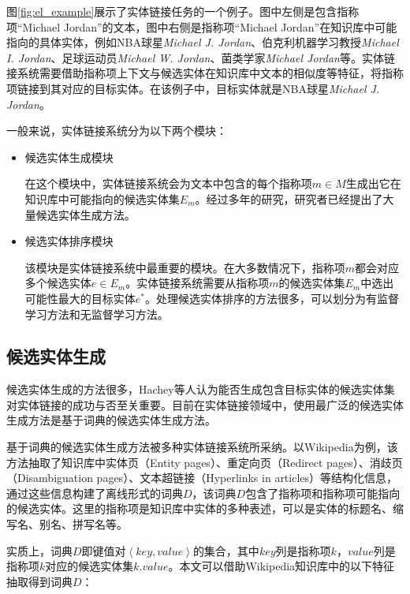 图\ref{fig:el_example}展示了实体链接任务的一个例子。图中左侧是包含指称项“Michael Jordan”的文本，图中右侧是指称项“Michael Jordan”在知识库中可能指向的具体实体，例如NBA球星\textit{Michael J. Jordan}、伯克利机器学习教授\textit{Michael I. Jordan}、足球运动员\textit{Michael W. Jordan}、菌类学家\textit{Michael Jordan}等。实体链接系统需要借助指称项上下文与候选实体在知识库中文本的相似度等特征，将指称项链接到其对应的目标实体。在该例子中，目标实体就是NBA球星\textit{Michael J. Jordan}。

一般来说，实体链接系统分为以下两个模块：
\begin{itemize}
	\item {候选实体生成模块
	
在这个模块中，实体链接系统会为文本中包含的每个指称项$m \in M$生成出它在知识库中可能指向的候选实体集$E_m$。经过多年的研究，研究者已经提出了大量候选实体生成方法。
}
	\item {候选实体排序模块
	
	该模块是实体链接系统中最重要的模块。在大多数情况下，指称项$m$都会对应多个候选实体$e\in E_m$。实体链接系统需要从指称项$m$的候选实体集$E_m$中选出可能性最大的目标实体$e^*$。处理候选实体排序的方法很多，可以划分为有监督学习方法和无监督学习方法。
}
\end{itemize}

\subsection{候选实体生成}\label{section:candidate_generate}
候选实体生成的方法很多，Hachey等人\cite{EELWW}认为能否生成包含目标实体的候选实体集对实体链接的成功与否至关重要。目前在实体链接领域中，使用最广泛的候选实体生成方法是基于词典的候选实体生成方法。

基于词典的候选实体生成方法被多种实体链接系统\cite{CELWTGBM,ELFEEKB}所采纳。以Wikipedia为例，该方法抽取了知识库中实体页（Entity pages）、重定向页（Redirect pages）、消歧页（Disambiguation pages）、文本超链接（Hyperlinks in articles）等结构化信息，通过这些信息构建了离线形式的词典$D$，该词典$D$包含了指称项和指称项可能指向的候选实体。这里的指称项是知识库中实体的多种表述，可以是实体的标题名、缩写名、别名、拼写名等。

实质上，词典$D$即键值对$\left\langle key,value\right\rangle $的集合，其中$key$列是指称项$k$，$value$列是指称项$k$对应的候选实体集$k.value$。本文可以借助Wikipedia知识库中的以下特征抽取得到词典$D$：

